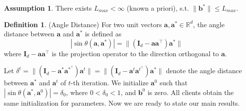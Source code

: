 \documentclass{article}
\theoremstyle{plain}
\newtheorem{lemma}[theorem]{Lemma}
\theoremstyle{definition}
\newtheorem{definition}[theorem]{Definition}
\newtheorem{assumption}[theorem]{Assumption}
\theoremstyle{remark}
\begin{document}
\begin{assumption}  \label{client-norm-1}
     There exists $L_{max} < \infty$ (known a priori),  s.t. $\lVert \mathbf{b}^*\rVert \leq  L_{max}$.
\end{assumption} 
\vspace{-0.2cm}
\begin{definition} (Angle Distance) \label{def:angle-distance}
    For two unit vectors $\mathbf{a}, \mathbf{a}^* \in \mathbb{R}^{d}$, the angle distance between $\mathbf{a}$ and $\mathbf{a}^*$ is defined as 
    \begin{equation}
        |\sin \theta ({\mathbf{a}, \mathbf{a}^*})| = \lVert (\mathbf{I}_d- \mathbf{a} \mathbf{a}^\top)\mathbf{a}^*\rVert
    \end{equation}
    where $\mathbf{I}_d- \mathbf{a} \mathbf{a}^\top$ is the projection operator to the direction orthogonal to $\mathbf{a}$.
\end{definition}
Let $\delta^t = \lVert (\mathbf{I}_d-\mathbf{a}^*\mathbf{a}^{*^\top})\mathbf{a}^t\rVert = \lVert (\mathbf{I}_d-\mathbf{a}^t\mathbf{a}^{t^\top})\mathbf{a}^*\rVert$ denote the angle distance between $\mathbf{a}^{*}$ and $\mathbf{a}^t$ of $t$-th iteration. We initialize $\mathbf{a}^0$ such that $|\sin{\theta}(\mathbf{a}^*,\mathbf{a}^0)|= \delta_0$, where $0<\delta_0<  1$, and $\mathbf{b}^0$ is zero. All clients obtain the same initialization for parameters. 
Now we are ready to state our main results. 

\end{document}
